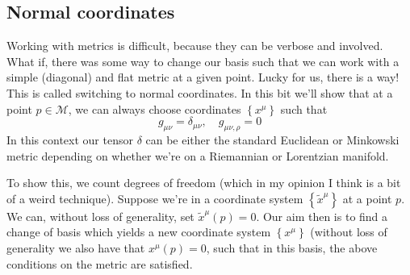 \subsection{Normal coordinates}
Working with metrics is difficult, because they can 
be verbose and involved. What if, there was some way to change our 
basis such that we can work with a simple (diagonal) and flat metric at 
a given point. Lucky for us, there is a way! 
This is called switching to normal coordinates. In this bit 
we'll show that at a point $ p \in \mathcal{ M } $, we 
can always choose coordinates $ \left\{  x ^\mu   \right\} $ such that 
\[
 g_{ \mu \nu }  = \delta_{ \mu \nu  }, \quad  g_{ \mu \nu, \rho }  = 0 
\] In this context our tensor $ \delta $ can be either 
the standard Euclidean or Minkowski metric depending on 
whether we're on a Riemannian or Lorentzian manifold. 

To show this, we count degrees of freedom (which in my opinion 
I think is a bit of a weird technique). Suppose we're in a coordinate system 
$ \left\{  \tilde{ x } ^ \mu   \right\}  $ at a point $ p $. We 
can, without loss of generality, set $ \tilde{ x } ^\mu ( p ) = 0 $. 
Our aim then is to find a change of basis which yields a new coordinate 
system $ \left\{  x^\mu   \right\} $ (without loss of generality 
we also have that $ x ^ \mu ( p ) = 0 $, such that in 
this basis, the above conditions on 
the metric are satisfied. 

